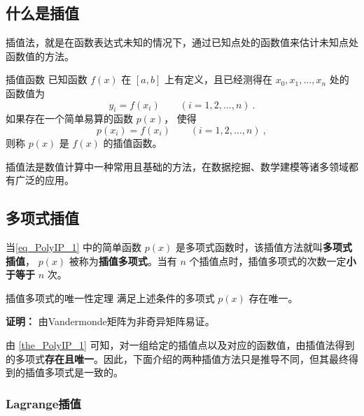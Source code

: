 
\begin{issues}
\issueTODO
\end{issues}
\subsection{什么是插值}
插值法，就是在函数表达式未知的情况下，通过已知点处的函数值来估计未知点处函数值的方法。\begin{definition}{插值函数}
已知函数 $f(x)$ 在 $\left[a,b\right] $ 上有定义，且已经测得在 $x_0,x_1,\dots, x_n$ 处的函数值为
\begin{equation}
y_i = f(x_i) \qquad (i = 1,2, \dots, n)~.
\end{equation}
如果存在一个简单易算的函数 $p(x)$， 使得
\begin{equation}
\label{eq_PolyIP_1}
p(x_i) = f(x_i)\qquad (i = 1,2, \dots, n)~,
\end{equation}
则称 $p(x)$ 是 $f(x)$ 的插值函数。
\end{definition}

插值法是数值计算中一种常用且基础的方法，在数据挖掘、数学建模等诸多领域都有广泛的应用。

\subsection{多项式插值}
当\autoref{eq_PolyIP_1} 中的简单函数 $p(x)$ 是多项式函数时，该插值方法就叫\textbf{多项式插值}， $p(x)$ 被称为\textbf{插值多项式}。当有 $n$ 个插值点时，插值多项式的次数一定\textbf{小于等于} $n$ 次。
\begin{theorem}{插值多项式的唯一性定理}\label{the_PolyIP_1}
满足上述条件的多项式 $p(x)$ 存在唯一。

\end{theorem}
\textbf{证明：} 由Vandermonde矩阵为非奇异矩阵易证。

由 \autoref{the_PolyIP_1} 可知，对一组给定的插值点以及对应的函数值，由插值法得到的多项式\textbf{存在且唯一}。因此，下面介绍的两种插值方法只是推导不同，但其最终得到的插值多项式是一致的。
\subsubsection{Lagrange插值}

